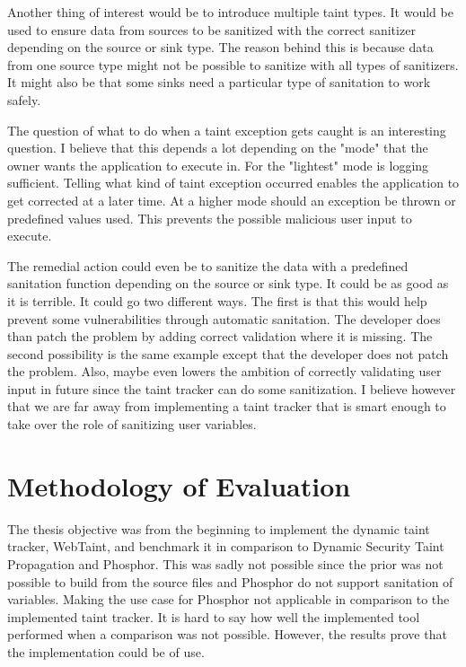 Another thing of interest would be to introduce multiple taint types. It would be used to ensure data from sources to be sanitized with the correct sanitizer depending on the source or sink type. The reason behind this is because data from one source type might not be possible to sanitize with all types of sanitizers. It might also be that some sinks need a particular type of sanitation to work safely. 

The question of what to do when a taint exception gets caught is an interesting question. I believe that this depends a lot depending on the "mode" that the owner wants the application to execute in. For the "lightest" mode is logging sufficient. Telling what kind of taint exception occurred enables the application to get corrected at a later time. At a higher mode should an exception be thrown or predefined values used. This prevents the possible malicious user input to execute. 

The remedial action could even be to sanitize the data with a predefined sanitation function depending on the source or sink type. It could be as good as it is terrible. It could go two different ways. The first is that this would help prevent some vulnerabilities through automatic sanitation. The developer does than patch the problem by adding correct validation where it is missing. The second possibility is the same example except that the developer does not patch the problem. Also, maybe even lowers the ambition of correctly validating user input in future since the taint tracker can do some sanitization. I believe however that we are far away from implementing a taint tracker that is smart enough to take over the role of sanitizing user variables.



\section{Methodology of Evaluation}
\label{methev}
The thesis objective was from the beginning to implement the dynamic taint tracker, WebTaint, and benchmark it in comparison to Dynamic Security Taint Propagation and Phosphor. This was sadly not possible since the prior was not possible to build from the source files and Phosphor do not support sanitation of variables. Making the use case for Phosphor not applicable in comparison to the implemented taint tracker. It is hard to say how well the implemented tool performed when a comparison was not possible. However, the results prove that the implementation could be of use.